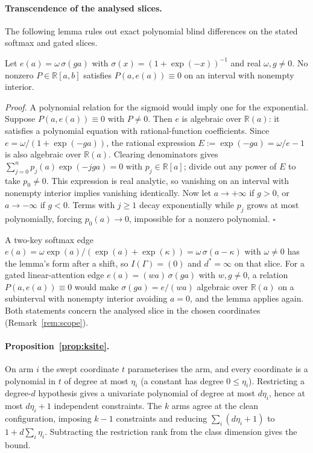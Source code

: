 \paragraph{Transcendence of the analysed slices.}
The following lemma rules out exact polynomial blind differences on the stated softmax and gated slices.
\begin{lemma}
Let $e(a)=\omega\,\sigma(ga)$ with $\sigma(x)=(1+\exp(-x))^{-1}$ and real $\omega,g\neq0$. No nonzero $P\in\mathbb
R[a,b]$ satisfies $P(a,e(a))\equiv0$ on an interval with nonempty interior.
\end{lemma}
\emph{Proof.} A polynomial relation for the sigmoid would imply one for the exponential.
Suppose $P(a,e(a))\equiv0$ with $P\neq0$. Then $e$ is algebraic over $\mathbb R(a)$: it satisfies a polynomial
equation with rational-function coefficients. Since $e=\omega/(1+\exp(-ga))$, the rational expression
$E:=\exp(-ga)=\omega/e-1$ is also algebraic over $\mathbb R(a)$. Clearing denominators gives
$\sum_{j=0}^np_j(a)\exp(-jga)=0$ with $p_j\in\mathbb R[a]$; divide out any power of $E$ to take $p_0\neq0$.
This expression is real analytic, so vanishing on an interval with nonempty interior implies vanishing identically.
Now let $a\to+\infty$ if $g>0$, or $a\to-\infty$ if $g<0$. Terms with $j\ge1$ decay exponentially while $p_j$
grows at most polynomially, forcing $p_0(a)\to0$, impossible for a nonzero polynomial. $\square$

A two-key softmax edge $e(a)=\omega\exp(a)/(\exp(a)+\exp(\kappa))=\omega\,\sigma(a-\kappa)$ with $\omega\neq0$ has the
lemma's form after a shift, so $I(\Gamma)=(0)$ and $d^*=\infty$ on that slice. For a gated linear-attention edge
$e(a)=(wa)\,\sigma(ga)$ with $w,g\neq0$, a relation $P(a,e(a))\equiv0$ would make $\sigma(ga)=e/(wa)$ algebraic over
$\mathbb R(a)$ on a subinterval with nonempty interior avoiding $a=0$, and the lemma applies again. Both statements concern the analysed slice
in the chosen coordinates (Remark~\ref{rem:scope}).

\paragraph{Proposition~\ref{prop:ksite}.} On arm $i$ the swept coordinate $t$ parameterises the arm, and every
coordinate is a polynomial in $t$ of degree at most $\eta_i$ (a constant has degree $0\le\eta_i$). Restricting a
degree-$d$ hypothesis gives a univariate polynomial of degree at most $d\eta_i$, hence at most $d\eta_i+1$
independent constraints. The $k$ arms agree at the clean configuration, imposing $k-1$ constraints and reducing
$\sum_i(d\eta_i+1)$ to $1+d\sum_i\eta_i$. Subtracting the restriction rank from the class dimension gives the bound.

